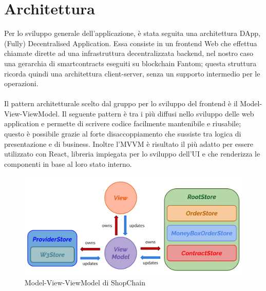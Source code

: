 \section{Architettura} \label{section:architettura}

Per lo sviluppo generale dell'applicazione, è stata seguita una architettura DApp, (Fully) Decentralised Application.
Essa consiste in un frontend Web che effettua chiamate dirette ad una infrastruttura decentralizzata backend, nel 
nostro caso una gerarchia di smartcontracts eseguiti su blockchain Fantom; 
questa struttura ricorda quindi una architettura client-server, senza un supporto intermedio per le operazioni.
\\
\\
Il pattern architetturale scelto dal gruppo per lo sviluppo del frontend è il Model-View-ViewModel. Il
seguente pattern è tra i più diffusi nello sviluppo delle web application e permette di scrivere codice
facilmente mantenibile e riusabile; questo è possibile grazie al forte disaccoppiamento che sussiste tra
logica di presentazione e di business. Inoltre l'MVVM è risultato il più adatto per essere utilizzato con
React, libreria impiegata per lo sviluppo dell'UI e che renderizza le componenti in base al loro stato
interno.

\begin{figure}[H]
    \centering
    \includegraphics[scale=0.3]{immagini/mvvm.png}
    \caption{Model-View-ViewModel di ShopChain}
\end{figure}

